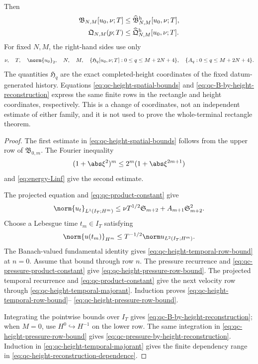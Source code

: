 \begin{proposition}
Then
\begin{align}
 \mathfrak B_{N,M}[u_0,\nu;T]
 &\le\widehat{\mathfrak B}_{N,M}^{\rm h}[u_0,\nu;T],
 \label{eq:qc-B-by-height-reconstruction}\\
 \mathfrak Q_{N,M}(p;T)
 &\le\widehat{\mathfrak Q}_{N,M}^{\rm h}[u_0,\nu;T].
 \label{eq:qc-pressure-by-height-reconstruction}
\end{align}
For fixed \(N,M\), the right-hand sides use only
\begin{equation}
 \nu,\quad T,\quad\norm{u_0}_2,\quad N,\quad M,\quad
 \{\mathfrak H_q[u_0,\nu;T]:0\le q\le M+2N+4\},
 \quad\{A_q:0\le q\le M+2N+4\}.
 \label{eq:qc-height-reconstruction-dependence}
\end{equation}
The quantities \(\mathfrak H_q\) are the exact completed-height coordinates
of the fixed datum-generated history.  Equations
\eqref{eq:qc-height-spatial-bounds} and
\eqref{eq:qc-B-by-height-reconstruction} express the same finite rows in the
rectangle and height coordinates, respectively.  This is a change of
coordinates, not an independent estimate of either family, and it is not used
to prove the whole-terminal rectangle theorem.
\end{proposition}

\begin{proof}
The first estimate in \eqref{eq:qc-height-spatial-bounds} follows from the
upper row of \(\mathfrak B_{0,m}\).  The Fourier inequality
\[
 (1+\abs\xi^2)^m\le2^m(1+\abs\xi^{2m+1})
\]
and \eqref{eq:energy-Linf} give the second estimate.

The projected equation and \eqref{eq:qc-product-constant} give
\[
 \norm{u_t}_{L^1(I_T;H^m)}
 \le\nu T^{1/2}\mathfrak S_{m+2}
 +A_{m+1}\mathfrak S_{m+2}^2.
\]
Choose a Lebesgue time \(t_m\in I_T\) satisfying
\[
 \norm{u(t_m)}_{H^m}
 \le T^{-1/2}\norm u_{L^2(I_T;H^m)}.
\]
The Banach-valued fundamental identity gives
\eqref{eq:qc-height-temporal-row-bound} at \(n=0\).
Assume that bound through row \(n\).  The pressure recurrence and
\eqref{eq:qc-pressure-product-constant} give
\eqref{eq:qc-height-pressure-row-bound}.  The projected temporal recurrence
and \eqref{eq:qc-product-constant} give the next velocity row through
\eqref{eq:qc-height-temporal-majorant}.  Induction proves
\eqref{eq:qc-height-temporal-row-bound}--%
\eqref{eq:qc-height-pressure-row-bound}.

Integrating the pointwise bounds over \(I_T\) gives
\eqref{eq:qc-B-by-height-reconstruction}; when \(M=0\), use
\(H^0\hookrightarrow H^{-1}\) on the lower row.  The same integration in
\eqref{eq:qc-height-pressure-row-bound} gives
\eqref{eq:qc-pressure-by-height-reconstruction}.  Induction in
\eqref{eq:qc-height-temporal-majorant} gives the finite dependency range in
\eqref{eq:qc-height-reconstruction-dependence}.
\end{proof}

